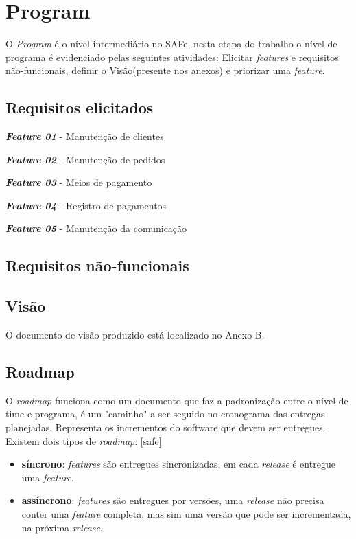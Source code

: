 \section{Program}
O \textit{Program} é o nível intermediário no SAFe, nesta etapa do trabalho o nível de programa é evidenciado pelas seguintes atividades: Elicitar \textit{features} e requisitos não-funcionais, definir o Visão(presente nos anexos) e priorizar uma \textit{feature}.
\subsection{Requisitos elicitados}
\textbf{\textit{Feature 01}} - Manutenção de clientes

\textbf{\textit{Feature 02}} - Manutenção de pedidos

\textbf{\textit{Feature 03}} - Meios de pagamento

\textbf{\textit{Feature 04}} - Registro de pagamentos

\textbf{\textit{Feature 05}} - Manutenção da comunicação
\subsection{Requisitos não-funcionais}
\subsection{Visão}
O documento de visão produzido está localizado no Anexo B.
\subsection{Roadmap}
O \textit{roadmap} funciona como um documento que faz a padronização entre o nível de time e programa, é um "caminho" a ser seguido no cronograma das entregas planejadas. Representa os incrementos do software que devem ser entregues. Existem dois tipos de \textit{roadmap}: \ref{safe}
\begin{itemize}
\item \textbf{síncrono}: \textit{features} são entregues sincronizadas, em cada \textit{release} é entregue uma \textit{feature}.
\item \textbf{assíncrono}: \textit{features} são entregues por versões, uma \textit{release} não precisa conter uma \textit{feature} completa, mas sim uma versão que pode ser incrementada, na próxima \textit{release}.
\end{itemize}

